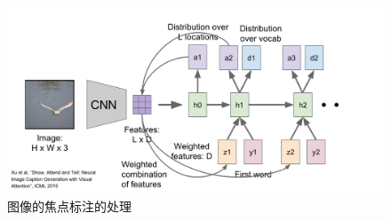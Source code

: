 \documentclass{article}
\begin{document}
\begin{figure}[H]
\centering
\includegraphics[scale=0.4]{figure/Image_Cap_Attention.PNG}
\caption{图像的焦点标注的处理}
\label{fig:14}
\end{figure}
\end{document}
